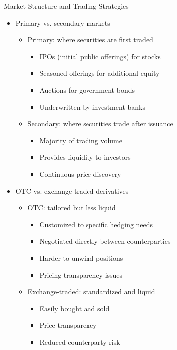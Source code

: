 \documentclass[10pt]{beamer}
\begin{document}
\begin{frame}{Market Structure and Trading Strategies}
  \begin{itemize}[<+->]
    \item Primary vs. secondary markets
      \begin{itemize}
        \item Primary: where securities are first traded
          \begin{itemize}
            \item IPOs (initial public offerings) for stocks
            \item Seasoned offerings for additional equity
            \item Auctions for government bonds
            \item Underwritten by investment banks
          \end{itemize}
        \item Secondary: where securities trade after issuance
          \begin{itemize}
            \item Majority of trading volume
            \item Provides liquidity to investors
            \item Continuous price discovery
          \end{itemize}
      \end{itemize}
    \item OTC vs. exchange-traded derivatives
      \begin{itemize}
        \item OTC: tailored but less liquid
          \begin{itemize}
            \item Customized to specific hedging needs
            \item Negotiated directly between counterparties
            \item Harder to unwind positions
            \item Pricing transparency issues
          \end{itemize}
        \item Exchange-traded: standardized and liquid
          \begin{itemize}
            \item Easily bought and sold
            \item Price transparency
            \item Reduced counterparty risk
          \end{itemize}
      \end{itemize}
  \end{itemize}
\end{frame}
\end{document}
